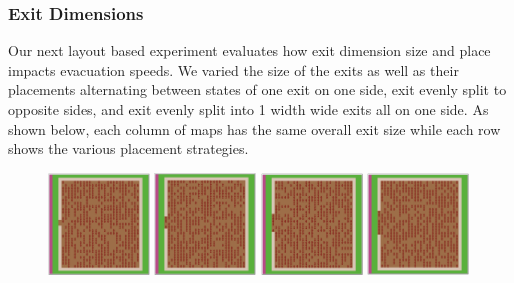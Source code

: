 \documentclass[12pt,letterpaper]{article}
\begin{document}
\subsubsection{Exit Dimensions}

Our next layout based experiment evaluates how exit dimension size and place impacts evacuation speeds.  We varied the size of the exits as well as their placements alternating between states of one exit on one side, exit evenly split to opposite sides, and exit evenly split into 1 width wide exits all on one side.  As shown below, each column of maps has the same overall exit size while each row shows the various placement strategies.

\begin{figure}[!ht]
  \centering
  \begin{minipage}[b]{.75\linewidth}
    \includegraphics[width=0.24\textwidth]{./figures/exit_dims_2_a.png}
    \includegraphics[width=0.24\textwidth]{./figures/exit_dims_4_a.png}
    \includegraphics[width=0.24\textwidth]{./figures/exit_dims_6_a.png}
    \includegraphics[width=0.24\textwidth]{./figures/exit_dims_8_a.png}
  \end{minipage}

\end{figure}
\end{document}
